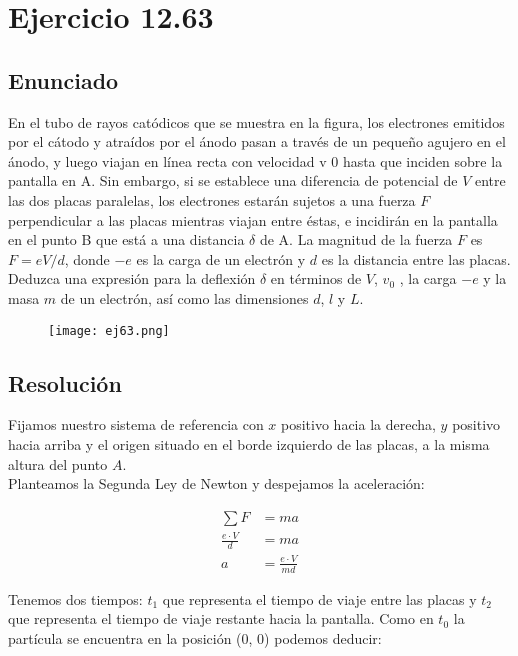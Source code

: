 \documentclass[11pt]{article}
\begin{document}
\section*{Ejercicio 12.63}

\subsection*{Enunciado}

En el tubo de rayos catódicos que se muestra en la figura, los electrones 
emitidos por el cátodo y atraídos por el ánodo pasan a través de
un pequeño agujero en el ánodo, y luego viajan en línea recta con velocidad
v 0 hasta que inciden sobre la pantalla en A. Sin embargo, si se establece una
diferencia de potencial de $V$ entre las dos placas paralelas, los electrones 
estarán sujetos a una fuerza $F$ perpendicular a las placas mientras viajan entre
éstas, e incidirán en la pantalla en el punto B que está a una distancia $\delta$ 
de A. La magnitud de la fuerza $F$ es $F = eV/d$, donde $-e$ es la carga de un 
electrón y $d$ es la distancia entre las placas. Deduzca una expresión para la 
deflexión $\delta$ en términos de $V$, $v_0$ , la carga $-e$ y la masa $m$ de un 
electrón, así como las dimensiones $d$, $l$ y $L$.

\begin{figure}[h!]
  \begin{center}
    \texttt{[image: ej63.png]}
  \end{center}
\end{figure}


\subsection*{Resolución}

Fijamos nuestro sistema de referencia con $x$ positivo hacia la derecha, $y$
positivo hacia arriba y el origen situado en el borde izquierdo de las placas, a 
la misma altura del punto $A$. \\

Planteamos la Segunda Ley de Newton y despejamos la aceleración:

\begin{align*}
  \sum F &= m a \\
  \frac{e \cdot V}{d} &= m a \\
  a &= \frac{e \cdot V}{md}
\end{align*}

Tenemos dos tiempos: $t_1$ que representa el tiempo de viaje entre las placas y
$t_2$ que representa el tiempo de viaje restante hacia la pantalla. Como en
$t_0$ la partícula se encuentra en la posición (0, 0) podemos deducir:
\end{document}
